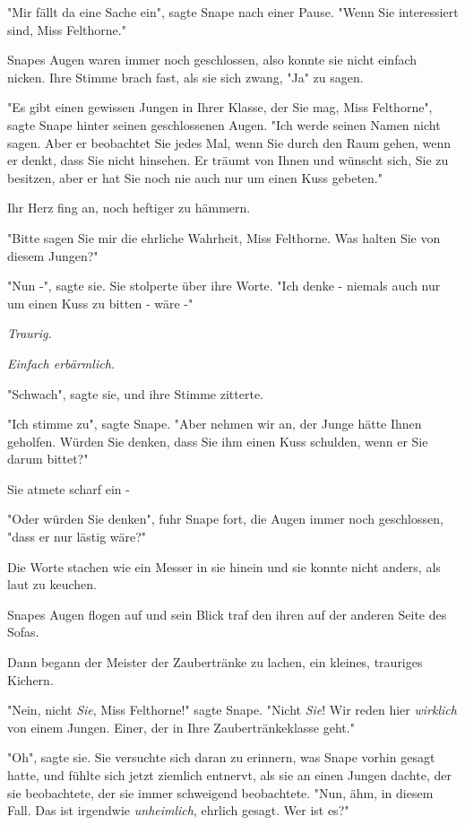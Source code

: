 {"Mir fällt da eine Sache ein", sagte Snape nach einer Pause. "Wenn Sie interessiert sind, Miss Felthorne."

Snapes Augen waren immer noch geschlossen, also konnte sie nicht einfach nicken. Ihre Stimme brach fast, als sie sich zwang, "Ja" zu sagen.

"Es gibt einen gewissen Jungen in Ihrer Klasse, der Sie mag, Miss Felthorne", sagte Snape hinter seinen geschlossenen Augen. "Ich werde seinen Namen nicht sagen. Aber er beobachtet Sie jedes Mal, wenn Sie durch den Raum gehen, wenn er denkt, dass Sie nicht hinsehen. Er träumt von Ihnen und wünscht sich, Sie zu besitzen, aber er hat Sie noch nie auch nur um einen Kuss gebeten."

Ihr Herz fing an, noch heftiger zu hämmern.

"Bitte sagen Sie mir die ehrliche Wahrheit, Miss Felthorne. Was halten Sie von diesem Jungen?"

"Nun -", sagte sie. Sie stolperte über ihre Worte. "Ich denke - niemals auch nur um einen Kuss zu bitten - wäre -"

\emph{Traurig.}

\emph{Einfach erbärmlich.}

"Schwach", sagte sie, und ihre Stimme zitterte.

"Ich stimme zu", sagte Snape. "Aber nehmen wir an, der Junge hätte Ihnen geholfen. Würden Sie denken, dass Sie ihm einen Kuss schulden, wenn er Sie darum bittet?"

Sie atmete scharf ein -

"Oder würden Sie denken", fuhr Snape fort, die Augen immer noch geschlossen, "dass er nur lästig wäre?"

Die Worte stachen wie ein Messer in sie hinein und sie konnte nicht anders, als laut zu keuchen.

Snapes Augen flogen auf und sein Blick traf den ihren auf der anderen Seite des Sofas.

Dann begann der Meister der Zaubertränke zu lachen, ein kleines, trauriges Kichern.

"Nein, nicht \emph{Sie}, Miss Felthorne!" sagte Snape. "Nicht \emph{Sie}! Wir reden hier \emph{wirklich} von einem Jungen. Einer, der in Ihre Zaubertränkeklasse geht."

"Oh", sagte sie. Sie versuchte sich daran zu erinnern, was Snape vorhin gesagt hatte, und fühlte sich jetzt ziemlich entnervt, als sie an einen Jungen dachte, der sie beobachtete, der sie immer schweigend beobachtete. "Nun, ähm, in diesem Fall. Das ist irgendwie \emph{unheimlich}, ehrlich gesagt. Wer ist es?"

}
